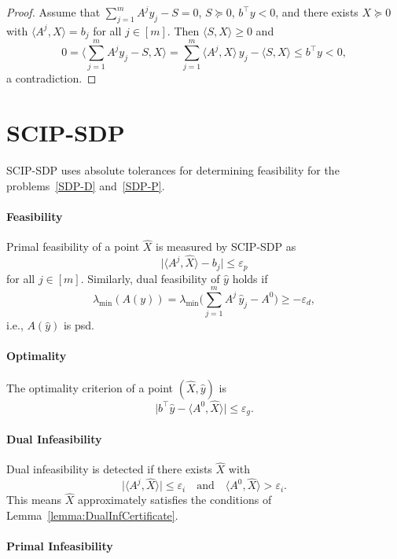 \documentclass[10pt, a4paper]{article}
\newcommand{\abs}[1]{\lvert{#1}\rvert}
\newcommand{\skal}[2]{\langle{#1},{#2}\rangle}
\newcommand{\T}{^{\top}}
\begin{document}
\begin{proof}
  Assume that $\sum_{j=1}^m A^j y_j - S = 0$, $S \succeq 0$, $b\T y < 0$,
  and there exists $X \succeq 0$ with $\skal{A^j}{X} = b_j$ for all
  $j \in [m]$. Then $\skal{S}{X} \geq 0$ and
  \[
  0 = \skal{\sum_{j=1}^m A^j y_j - S}{X} = \sum_{j=1}^m \skal{A^j}{X}\, y_j
  - \skal{S}{X} \leq b\T y < 0,
  \]
  a contradiction.
\end{proof}

\section{SCIP-SDP}

SCIP-SDP uses absolute tolerances for determining feasibility for the
problems~\eqref{SDP-D} and~\eqref{SDP-P}.

\paragraph{Feasibility}

Primal feasibility of a point $\hat{X}$ is measured by SCIP-SDP as
\[
\abs{\skal{A^j}{\hat{X}} - b_j} \leq \varepsilon_p
\]
for all $j \in [m]$. Similarly, dual feasibility of $\hat{y}$ holds if
\[
\lambda_{\min}(A(y)) = \lambda_{\min}\Big(\sum_{j=1}^m A^j\, \hat{y}_j -
A^0\Big) \geq - \varepsilon_d,
\]
i.e., $A(\hat{y})$ is psd.


\paragraph{Optimality}

The optimality criterion of a point $(\hat{X}, \hat{y})$ is
\[
\abs{b\T \hat{y} - \skal{A^0}{\hat{X}}} \leq \varepsilon_g.
\]

\paragraph{Dual Infeasibility}

Dual infeasibility is detected if there exists $\hat{X}$ with
\[
\abs{\skal{A^j}{\hat{X}}} \leq \varepsilon_i \quad\text{and}\quad
\skal{A^0}{\hat{X}} > \varepsilon_i.
\]
This means $\hat{X}$ approximately satisfies the conditions of
Lemma~\ref{lemma:DualInfCertificate}.

\paragraph{Primal Infeasibility}
\end{document}
